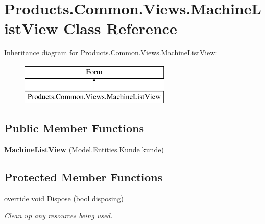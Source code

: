 \hypertarget{class_products_1_1_common_1_1_views_1_1_machine_list_view}{}\section{Products.\+Common.\+Views.\+Machine\+List\+View Class Reference}
\label{class_products_1_1_common_1_1_views_1_1_machine_list_view}
Inheritance diagram for Products.\+Common.\+Views.\+Machine\+List\+View\+:\begin{figure}[H]
\begin{center}
\leavevmode
\includegraphics[height=2.000000cm]{class_products_1_1_common_1_1_views_1_1_machine_list_view}
\end{center}
\end{figure}
\subsection*{Public Member Functions}
\begin{DoxyCompactItemize}
\item 
{\bfseries Machine\+List\+View} (\hyperlink{class_products_1_1_model_1_1_entities_1_1_kunde}{Model.\+Entities.\+Kunde} kunde)\hypertarget{class_products_1_1_common_1_1_views_1_1_machine_list_view_ac17edb2b09d4057b7da43a2defd0ed4b}{}\label{class_products_1_1_common_1_1_views_1_1_machine_list_view_ac17edb2b09d4057b7da43a2defd0ed4b}

\end{DoxyCompactItemize}
\subsection*{Protected Member Functions}
\begin{DoxyCompactItemize}
\item 
override void \hyperlink{class_products_1_1_common_1_1_views_1_1_machine_list_view_aba6ff9c289f482f1e1ea84d31c4bb889}{Dispose} (bool disposing)
\begin{DoxyCompactList}\small\item\em Clean up any resources being used. \end{DoxyCompactList}\end{DoxyCompactItemize}


